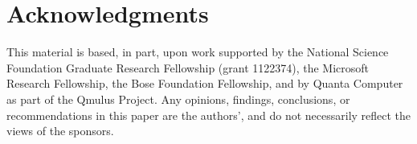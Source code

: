 \documentclass{sigchi}
\begin{document}
\section{Acknowledgments}

This material is based, in part, upon work supported by the National Science Foundation Graduate Research Fellowship (grant 1122374), the Microsoft Research Fellowship, the Bose Foundation Fellowship, and by Quanta Computer as part of the Qmulus Project. Any opinions, findings, conclusions, or recommendations in this paper are the authors', and do not necessarily reflect the views of the sponsors.


%
%
%
%
%
\balance




\end{document}
